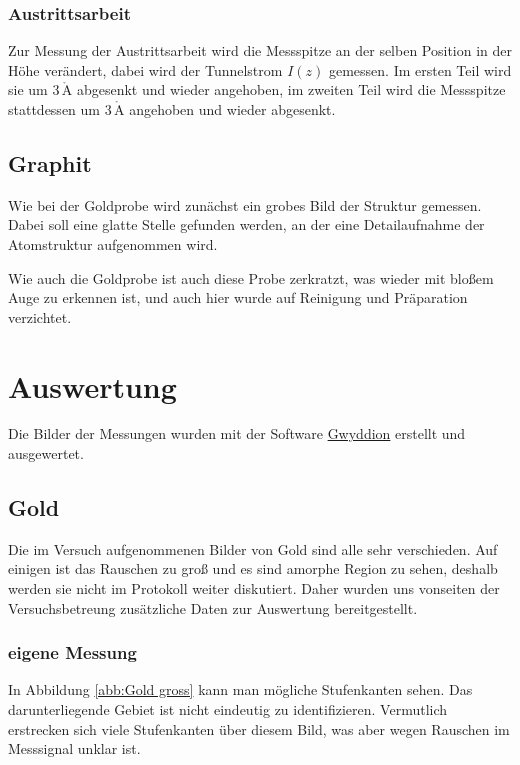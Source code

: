 \documentclass[12pt,a4paper]{scrartcl}
\numberwithin{equation}{section} %
\begin{document}
\hypertarget{austrittsarbeit}{%
\subsubsection{Austrittsarbeit}\label{austrittsarbeit}}

Zur Messung der Austrittsarbeit wird die Messspitze an der selben Position in der Höhe verändert, dabei wird der Tunnelstrom $I(z)$ gemessen. Im ersten Teil wird sie um $3\,\mathrm{\mathring{A}}$ abgesenkt und wieder angehoben, im zweiten Teil wird die Messspitze stattdessen um $3\,\mathrm{\mathring{A}}$ angehoben und wieder abgesenkt.

\hypertarget{graphit}{%
\subsection{Graphit}\label{graphit}}

Wie bei der Goldprobe wird zunächst ein grobes Bild der Struktur gemessen. Dabei soll eine glatte Stelle gefunden werden, an der eine Detailaufnahme der Atomstruktur aufgenommen wird.

Wie auch die Goldprobe ist auch diese Probe zerkratzt, was wieder mit bloßem Auge zu erkennen ist, und auch hier wurde auf Reinigung und Präparation verzichtet.

\clearpage
\hypertarget{auswertung}{%
\section{Auswertung}\label{auswertung}}
Die Bilder der Messungen wurden mit der Software \href{http://gwyddion.net}{Gwyddion} \cite{Gwyddion} erstellt und ausgewertet.

\hypertarget{gold-1}{%
\subsection{Gold}\label{gold-1}}

Die im Versuch aufgenommenen Bilder von Gold sind alle sehr verschieden. Auf einigen ist das Rauschen zu groß und es sind amorphe Region zu sehen, deshalb werden sie nicht im Protokoll weiter diskutiert. Daher wurden uns vonseiten der Versuchsbetreung zusätzliche Daten zur Auswertung bereitgestellt. \cite{Grover}

\hypertarget{eigene-messung}{%
\subsubsection{eigene Messung}\label{eigene-messung}}
In Abbildung \ref{abb:Gold gross} kann man mögliche Stufenkanten sehen. Das darunterliegende Gebiet ist nicht eindeutig zu identifizieren. Vermutlich erstrecken sich viele Stufenkanten über diesem Bild, was aber wegen Rauschen im Messsignal unklar ist.
\end{document}
